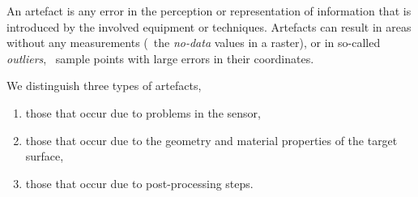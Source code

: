An artefact is any error in the perception or representation of information that is introduced by the involved equipment or techniques. 
Artefacts can result in areas without any measurements (\eg\ the \emph{no-data} values in a raster), or in so-called \emph{outliers}, \ie\ sample points with large errors in their coordinates. 

We distinguish three types of artefacts, 
\begin{enumerate}
	\item those that occur due to problems in the sensor, 
	\item those that occur due to the geometry and material properties of the target surface, 
	\item those that occur due to post-processing steps.
\end{enumerate}


